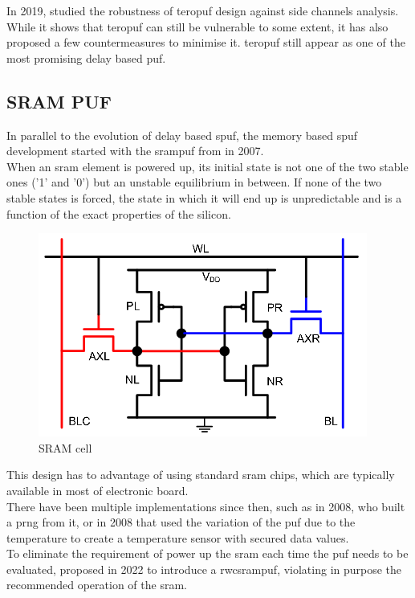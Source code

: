 In 2019, \cite{tebelmann_side-channel_2019} studied the robustness of \acrshort{teropuf} design against side channels analysis. While it shows that \acrshort{teropuf} can still be vulnerable to some extent, it has also proposed a few countermeasures to minimise it. \acrshort{teropuf} still appear as one of the most promising delay based \acrshort{puf}.



\subsection{SRAM PUF}

In parallel to the evolution of delay based \acrshort{spuf}, the memory based \acrshort{spuf} development started with the \acrfull{srampuf} from \cite{paillier_fpga_2007} in 2007.\\
When an \acrshort{sram} element is powered up, its initial state is not one of the two stable ones ('1' and '0') but an unstable equilibrium in between. If none of the two stable states is forced, the state in which it will end up is unpredictable and is a function of the exact properties of the silicon.

\begin{figure}[H]
    \centering
    \includegraphics[width=0.45\linewidth]{images/SRAM.png}
    \caption{SRAM cell \cite{paillier_fpga_2007}}
    \label{fig:SRAM}
\end{figure}

This design has to advantage of using standard \acrshort{sram} chips, which are typically available in most of electronic board.\\
There have been multiple implementations since then, such as \cite{chen_fpga_2018} in 2008, who built a \acrfull{prng} from it, or \cite{usmani_applications_2018} in 2008 that used the variation of the \acrshort{puf} due to the temperature to create a temperature sensor with secured data values.\\


To eliminate the requirement of power up the \acrshort{sram} each time the \acrshort{puf} needs to be evaluated, \cite{cicek_new_2022} proposed in 2022 to introduce a \acrfull{rwcsrampuf}, violating in purpose the recommended operation of the \acrshort{sram}.


